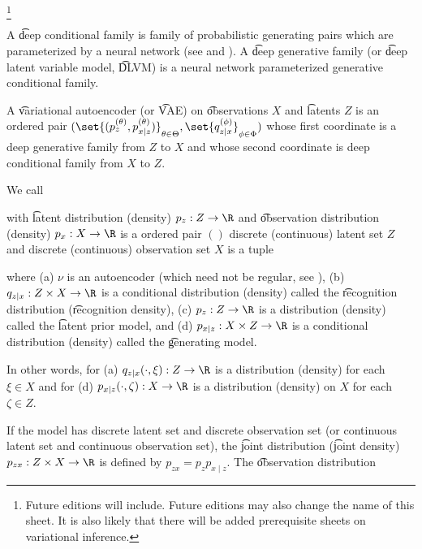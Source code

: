 
\footnote{Future editions will include. Future editions may also change the name of this sheet. It is also likely that there will be added prerequisite sheets on variational inference.}


A \t{deep conditional family} is family of probabilistic generating pairs which are parameterized by a neural network (see  and ).
A \t{deep generative family} (or \t{deep latent variable model}, \t{DLVM}) is a neural network parameterized generative conditional family.

A \t{variational autoencoder} (or \t{VAE}) on \t{observations} $X$ and \t{latents} $Z$ is an ordered pair
$(\set{ (p_{z}^{(\theta)}, p^{(\theta)}_{x \mid z}) }_{\theta \in \Theta}, \set{ q_{z \mid x}^{(\phi)} }_{\phi \in \Phi})$
whose first coordinate is a deep generative family from $Z$ to $X$ and whose second coordinate is deep conditional family from $X$ to $Z$.

We call


with \t{latent distribution} (density) $p_z: Z \to \R$ and \t{observation distribution} (density) $p_x: X \to \R$ is a ordered pair $()$ discrete (continuous) latent set $Z$ and discrete (continuous) observation set $X$ is a tuple






where
(a) $\nu$ is an autoencoder (which need not be regular, see ),
(b) $q_{z \mid x}: Z \times X \to \R$ is a conditional distribution (density) called the \t{recognition distribution} (\t{recognition density}),
(c) $p_{z}: Z \to \R$ is a distribution (density) called the \t{latent prior model}, and
(d) $p_{x \mid z}: X \times Z \to \R$ is a conditional distribution (density) called the \t{generating model}.

In other words, for (a) $q_{z \mid x}(\cdot, \xi): Z \to \R$ is a distribution (density) for each $\xi \in X$ and for (d) $p_{x \mid z}(\cdot, \zeta): X \to \R$ is a distribution (density) on $X$ for each $\zeta \in Z$.

If the model has discrete latent set and discrete observation set (or continuous latent set and continuous observation set), the \t{joint distribution} (\t{joint density}) $p_{zx}: Z \times X \to \R$ is defined by $p_{zx} = p_{z}p_{x \mid z}$.
The \t{observation distribution}

